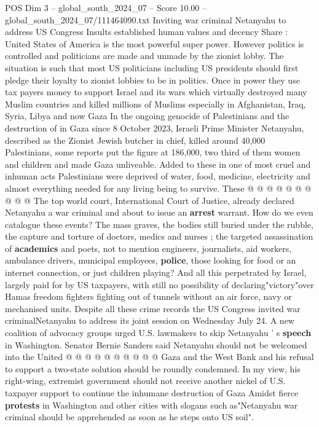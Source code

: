 \begin{textsample}{POS Dim 3 – global\_south\_2024\_07 – Score 10.00 – global\_south\_2024\_07/111464090.txt}  \label{ex:f3_pos_311}
Inviting war criminal Netanyahu to address US Congress Insults established human values and decency Share : United States of America is the most powerful super power.
However politics is controlled and politicians are made and unmade by the zionist lobby.
The situation is such that most US politicians including US presidents should first pledge their loyalty to zionist lobbies to be in politics.
Once in power they use tax payers money to support Israel and its wars which virtually destroyed many Muslim countries and killed millions of Muslims especially in Afghanistan, Iraq, Syria, Libya and now Gaza In the ongoing genocide of Palestinians and the destruction of in Gaza since 8 October 2023, Israeli Prime Minister Netanyahu, described as the Zionist Jewish butcher in chief, killed around 40,000 Palestinians, some reports put the figure at 186,000, two third of them women and children and made Gaza unliveable.
Added to these in one of most cruel and inhuman acts Palestinians were deprived of water, food, medicine, electricity and almost everything needed for any living being to survive.
These @ @ @ @ @ @ @ @ @ @ The top world court, International Court of Justice, already declared Netanyahu a war criminal and about to issue an \textbf{arrest} warrant.
How do we even catalogue these events?
The mass graves, the bodies still buried under the rubble, the capture and torture of doctors, medics and nurses ; the targeted assassination of \textbf{academics} and poets, not to mention engineers, journalists, aid workers, ambulance drivers, municipal employees, \textbf{police}, those looking for food or an internet connection, or just children playing?
And all this perpetrated by Israel, largely paid for by US taxpayers, with still no possibility of declaring"victory"over Hamas freedom fighters fighting out of tunnels without an air force, navy or mechanised units.
Despite all these crime records the US Congress invited war criminalNetanyahu to address its joint session on Wednesday July 24.
A new coalition of advocacy groups urged U.S. lawmakers to skip Netanyahu ' s \textbf{speech} in Washington.
Senator Bernie Sanders said Netanyahu should not be welcomed into the United @ @ @ @ @ @ @ @ @ @ Gaza and the West Bank and his refusal to support a two-state solution should be roundly condemned.
In my view, his right-wing, extremist government should not receive another nickel of U.S. taxpayer support to continue the inhumane destruction of Gaza Amidst fierce \textbf{protests} in Washington and other cities with slogans such as"Netanyahu war criminal should be apprehended as soon as he steps onto US soil".

\end{textsample}
